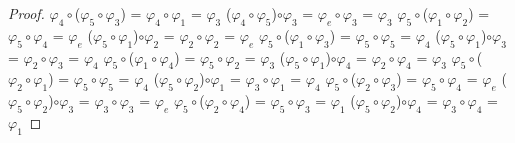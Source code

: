\documentclass[10pt,a4paper,oneside]{article}
\begin{document}
\begin{proof}
					$\varphi_{4}\circ$($\varphi_{5}\circ\varphi_{3}$) = $\varphi_{4}\circ\varphi_{1}$ = $\varphi_{3}$
					\newline
					($\varphi_{4}\circ\varphi_{5}$)$\circ\varphi_{3}$ = $\varphi_{e}\circ\varphi_{3}$ = $\varphi_{3}$
					\newline
					\newline
					$\varphi_{5}\circ$($\varphi_{1}\circ\varphi_{2}$) = $\varphi_{5}\circ\varphi_{4}$ = $\varphi_{e}$
					\newline
					($\varphi_{5}\circ\varphi_{1}$)$\circ\varphi_{2}$ = $\varphi_{2}\circ\varphi_{2}$ = $\varphi_{e}$
					\newline
					\newline
					$\varphi_{5}\circ$($\varphi_{1}\circ\varphi_{3}$) = $\varphi_{5}\circ\varphi_{5}$ = $\varphi_{4}$
					\newline
					($\varphi_{5}\circ\varphi_{1}$)$\circ\varphi_{3}$ = $\varphi_{2}\circ\varphi_{3}$ = $\varphi_{4}$
					\newline
					\newline
					$\varphi_{5}\circ$($\varphi_{1}\circ\varphi_{4}$) = $\varphi_{5}\circ\varphi_{2}$ = $\varphi_{3}$
					\newline
					($\varphi_{5}\circ\varphi_{1}$)$\circ\varphi_{4}$ = $\varphi_{2}\circ\varphi_{4}$ = $\varphi_{3}$
					\newline
					\newline
					$\varphi_{5}\circ$($\varphi_{2}\circ\varphi_{1}$) = $\varphi_{5}\circ\varphi_{5}$ = $\varphi_{4}$
					\newline
					($\varphi_{5}\circ\varphi_{2}$)$\circ\varphi_{1}$ = $\varphi_{3}\circ\varphi_{1}$ = $\varphi_{4}$
					\newline
					\newline
					$\varphi_{5}\circ$($\varphi_{2}\circ\varphi_{3}$) = $\varphi_{5}\circ\varphi_{4}$ = $\varphi_{e}$
					\newline
					($\varphi_{5}\circ\varphi_{2}$)$\circ\varphi_{3}$ = $\varphi_{3}\circ\varphi_{3}$ = $\varphi_{e}$
					\newline
					\newline
					$\varphi_{5}\circ$($\varphi_{2}\circ\varphi_{4}$) = $\varphi_{5}\circ\varphi_{3}$ = $\varphi_{1}$
					\newline
					($\varphi_{5}\circ\varphi_{2}$)$\circ\varphi_{4}$ = $\varphi_{3}\circ\varphi_{4}$ = $\varphi_{1}$
					\newline
					\newline

\end{proof}
\end{document}
